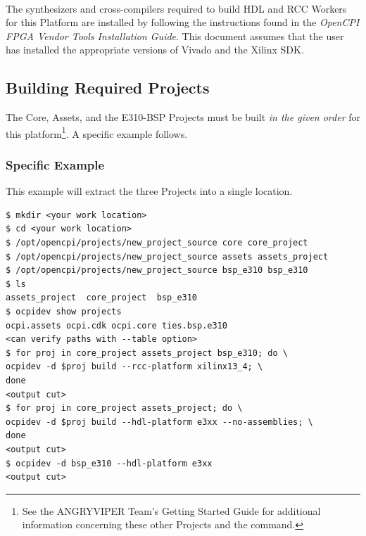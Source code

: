 \begin{flushleft}
\begin{center}
\end{center}
\ \bigskip %

The synthesizers and cross-compilers required to build HDL and RCC Workers for this Platform are installed by following the instructions found in the \textit{OpenCPI FPGA Vendor Tools Installation Guide}. This document assumes that the user has installed the appropriate versions of Vivado and the Xilinx SDK.\\ \bigskip

\subsection{Building Required Projects}
The Core, Assets, and the E310-BSP Projects must be built \textit{in the given order} for this platform\footnote{See the ANGRYVIPER Team's Getting Started Guide for additional information concerning these other Projects and the  command.}. A specific example follows. \bigskip

\subsubsection*{Specific Example}
This example will extract the three Projects into a single location.
\begin{lstlisting}[showspaces=false]
$ mkdir <your work location>
$ cd <your work location>
$ /opt/opencpi/projects/new_project_source core core_project
$ /opt/opencpi/projects/new_project_source assets assets_project
$ /opt/opencpi/projects/new_project_source bsp_e310 bsp_e310
$ ls
assets_project  core_project  bsp_e310
$ ocpidev show projects
ocpi.assets ocpi.cdk ocpi.core ties.bsp.e310
<can verify paths with --table option>
$ for proj in core_project assets_project bsp_e310; do \
ocpidev -d $proj build --rcc-platform xilinx13_4; \
done
<output cut>
$ for proj in core_project assets_project; do \
ocpidev -d $proj build --hdl-platform e3xx --no-assemblies; \
done
<output cut>
$ ocpidev -d bsp_e310 --hdl-platform e3xx
<output cut>
\end{lstlisting}


\end{flushleft}

